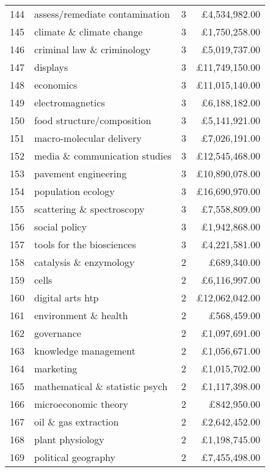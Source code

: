 \begin{spacing}{0.9}
\begin{longtable}[c]{r|>{\raggedleft\arraybackslash}m{6.5cm}|>{\raggedleft\arraybackslash}m{1.9cm}|r}
{144} & {assess/remediate contamination} & {3} & {\pounds4,534,982.00}\\
{145} & {climate \& climate change} & {3} & {\pounds1,750,258.00}\\
{146} & {criminal law \& criminology} & {3} & {\pounds5,019,737.00}\\
{147} & {displays} & {3} & {\pounds11,749,150.00}\\
{148} & {economics} & {3} & {\pounds11,015,140.00}\\
{149} & {electromagnetics} & {3} & {\pounds6,188,182.00}\\
{150} & {food structure/composition} & {3} & {\pounds5,141,921.00}\\
{151} & {macro-molecular delivery} & {3} & {\pounds7,026,191.00}\\
{152} & {media \& communication studies} & {3} & {\pounds12,545,468.00}\\
{153} & {pavement engineering} & {3} & {\pounds10,890,078.00}\\
{154} & {population ecology} & {3} & {\pounds16,690,970.00}\\
{155} & {scattering \& spectroscopy} & {3} & {\pounds7,558,809.00}\\
{156} & {social policy} & {3} & {\pounds1,942,868.00}\\
{157} & {tools for the biosciences} & {3} & {\pounds4,221,581.00}\\
{158} & {catalysis \& enzymology} & {2} & {\pounds689,340.00}\\
{159} & {cells} & {2} & {\pounds6,116,997.00}\\
{160} & {digital arts htp} & {2} & {\pounds12,062,042.00}\\
{161} & {environment \& health} & {2} & {\pounds568,459.00}\\
{162} & {governance} & {2} & {\pounds1,097,691.00}\\
{163} & {knowledge management} & {2} & {\pounds1,056,671.00}\\
{164} & {marketing} & {2} & {\pounds1,015,702.00}\\
{165} & {mathematical \& statistic psych} & {2} & {\pounds1,117,398.00}\\
{166} & {microeconomic theory} & {2} & {\pounds842,950.00}\\
{167} & {oil \& gas extraction} & {2} & {\pounds2,642,452.00}\\
{168} & {plant physiology} & {2} & {\pounds1,198,745.00}\\
{169} & {political geography} & {2} & {\pounds7,455,498.00}\\

\end{longtable}
\end{spacing}
